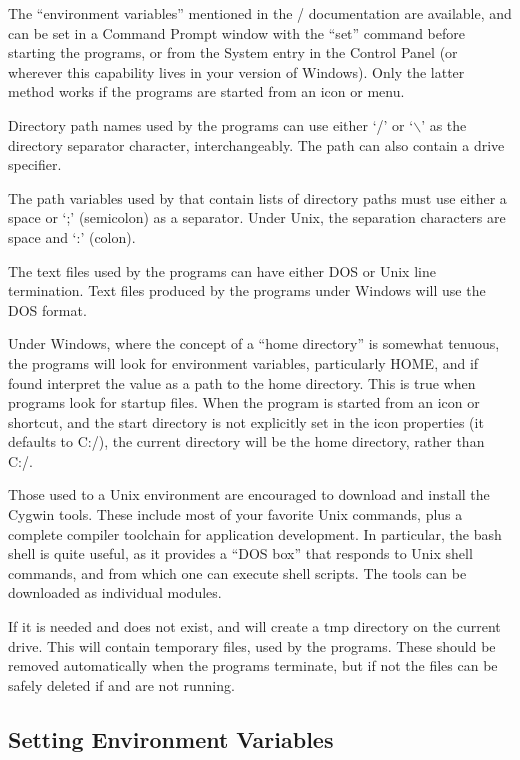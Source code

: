 \begin{itemize}
The ``environment variables'' mentioned in the {\Xic}/{\WRspice}
documentation are available, and can be set in a {\cb Command Prompt}
window with the ``{\vt set}'' command before starting the programs, or
from the {\cb System} entry in the {\cb Control Panel} (or wherever
this capability lives in your version of Windows).  Only the latter
method works if the programs are started from an icon or menu.

Directory path names used by the programs can use either `/' or
`$\backslash$' as the directory separator character, interchangeably. 
The path can also contain a drive specifier.

The path variables used by {\Xic} that contain lists of directory
paths must use either a space or `;' (semicolon) as a separator. 
Under Unix, the separation characters are space and `:' (colon).

The text files used by the programs can have either DOS or Unix line
termination.  Text files produced by the programs under Windows will
use the DOS format.

Under Windows, where the concept of a ``home directory'' is somewhat
tenuous, the programs will look for environment variables,
particularly {\et HOME}, and if found interpret the value as a path to
the home directory.  This is true when programs look for startup
files.  When the program is started from an icon or shortcut, and the
start directory is not explicitly set in the icon properties (it
defaults to {\vt C:/}), the current directory will be the home
directory, rather than {\vt C:/}.

Those used to a Unix environment are encouraged to download and
install the Cygwin tools.  These include most of your favorite Unix
commands, plus a complete compiler toolchain for application
development.  In particular, the bash shell is quite useful, as it
provides a ``DOS box'' that responds to Unix shell commands, and from
which one can execute shell scripts.  The tools can be downloaded as
individual modules.

If it is needed and does not exist, {\Xic} and {\WRspice} will create
a {\vt {$\backslash$}tmp} directory on the current drive.  This will
contain temporary files, used by the programs.  These should be
removed automatically when the programs terminate, but if not the
files can be safely deleted if {\Xic} and {\WRspice} are not running.

\subsection{Setting Environment Variables}


\end{itemize}

